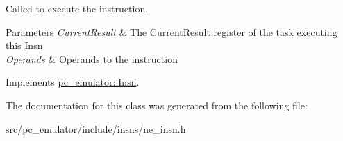 Called to execute the instruction. 


\begin{DoxyParams}{Parameters}
{\em Current\+Result} & The Current\+Result register of the task executing this \hyperlink{classpc__emulator_1_1Insn}{Insn} \\
\hline
{\em Operands} & Operands to the instruction \\
\hline
\end{DoxyParams}


Implements \hyperlink{classpc__emulator_1_1Insn_a103d27030e872a799e313df16c1f3d66}{pc\+\_\+emulator\+::\+Insn}.



The documentation for this class was generated from the following file\+:\begin{DoxyCompactItemize}
\item 
src/pc\+\_\+emulator/include/insns/ne\+\_\+insn.\+h\end{DoxyCompactItemize}
